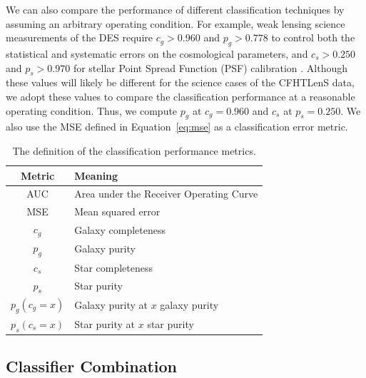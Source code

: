 \documentclass[useAMS,usenatbib]{mn2e}
\begin{document}
We can also compare the performance of different classification techniques
by assuming an arbitrary operating condition.
For example, weak lensing science measurements
of the DES require $c_g > 0.960$ and $p_g > 0.778$
to control both the statistical and systematic errors
on the cosmological parameters,
and $c_s > 0.250$ and $p_s > 0.970$
for stellar Point Spread Function (PSF) calibration
\citep{soumagnac2013star}.
Although these values will likely be different
for the science cases of the CFHTLenS data,
we adopt these values to compare the classification performance
at a reasonable operating condition.
Thus, we compute $p_{g}$ at $c_g=0.960$
and $c_{s}$ at $p_s=0.250$.
We also use the MSE defined in Equation~\ref{eq:mse}
as a classification error metric.

\begin{table}
  \caption{The definition of the classification performance metrics.}
  \centering
  \begin{tabular}{c l}
  Metric & Meaning \\
  \hline
  AUC & Area under the Receiver Operating Curve \\
  MSE & Mean squared error \\
  $c_g$ & Galaxy completeness \\
  $p_g$ & Galaxy purity \\
  $c_s$ & Star completeness \\
  $p_s$ & Star purity \\
  $p_g(c_g=x)$ & Galaxy purity at $x$ galaxy purity \\
  $p_s(c_s=x)$ & Star purity at $x$ star purity \\
  \end{tabular}
  \label{table:metrics}
\end{table}


\subsection{Classifier Combination}
  \label{section:rich_training}
\end{document}
